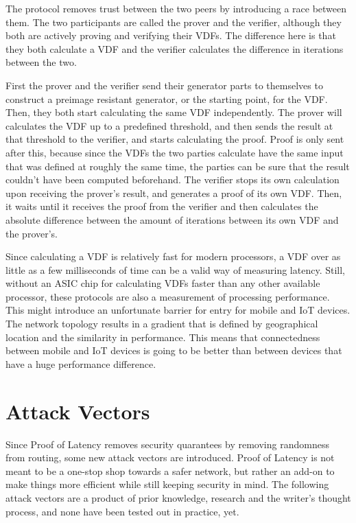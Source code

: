 The protocol removes trust between the two peers by introducing a race between them. The two participants are called the prover and the verifier, although they both are actively proving and verifying their VDFs. The difference here is that they both calculate a VDF and the verifier calculates the difference in iterations between the two.

First the prover and the verifier send their generator parts to themselves to construct a preimage resistant generator, or the starting point, for the VDF. Then, they both start calculating the same VDF independently. The prover will calculates the VDF up to a predefined threshold, and then sends the result at that threshold to the verifier, and starts calculating the proof. Proof is only sent after this, because since the VDFs the two parties calculate have the same input that was defined at roughly the same time, the parties can be sure that the result couldn't have been computed beforehand. The verifier stops its own calculation upon receiving the prover's result, and generates a proof of its own VDF. Then, it waits until it receives the proof from the verifier and then calculates the absolute difference between the amount of iterations between its own VDF and the prover's.

Since calculating a VDF is relatively fast for modern processors, a VDF over as little as a few milliseconds of time can be a valid way of measuring latency. Still, without an ASIC chip for calculating VDFs faster than any other available processor, these protocols are also a measurement of processing performance. This might introduce an unfortunate barrier for entry for mobile and IoT devices. The network topology results in a gradient that is defined by geographical location and the similarity in performance. This means that connectedness between mobile and IoT devices is going to be better than between devices that have a huge performance difference.

\section{Attack Vectors}
Since Proof of Latency removes security quarantees by removing randomness from routing, some new attack vectors are introduced. Proof of Latency is not meant to be a one-stop shop towards a safer network, but rather an add-on to make things more efficient while still keeping security in mind. The following attack vectors are a product of prior knowledge, research and the writer's thought process, and none have been tested out in practice, yet.

